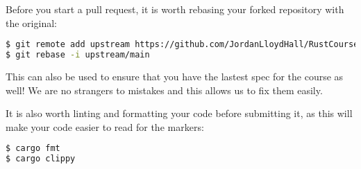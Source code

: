 \documentclass{report}
\begin{document}
Before you start a pull request, it is worth rebasing your forked repository with
the original:
\begin{lstlisting}[language=Bash]
$ git remote add upstream https://github.com/JordanLloydHall/RustCourse
$ git rebase -i upstream/main
\end{lstlisting}

This can also be used to ensure that you have the lastest spec for the course as well! 
We are no strangers to mistakes and this allows us to fix them easily.

It is also worth linting and formatting your code before submitting it, as this will make your code
easier to read for the markers:
\begin{lstlisting}[language=Bash]
$ cargo fmt
$ cargo clippy
\end{lstlisting}
\end{document}
